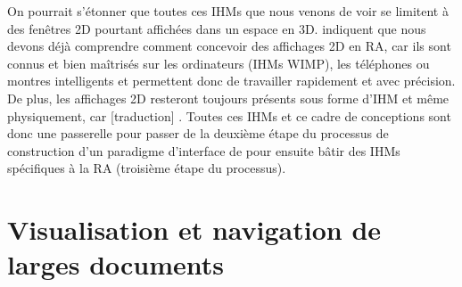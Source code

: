 
On pourrait s'étonner que toutes ces IHMs que nous venons de voir se limitent à des fenêtres 2D pourtant affichées dans un espace en 3D. \cite{Ens2014a} indiquent que nous devons déjà comprendre comment concevoir des affichages 2D en RA, car ils sont connus et bien maîtrisés sur les ordinateurs (IHMs WIMP), les téléphones ou montres intelligents et permettent donc de travailler rapidement et avec précision. De plus, les affichages 2D resteront toujours présents sous forme d'IHM et même physiquement, car [traduction]  \citep[p. 1]{Ens2014a}. Toutes ces IHMs et ce cadre de conceptions sont donc une passerelle pour passer de la deuxième étape du processus de construction d'un paradigme d'interface de \cite{Billinghurst2005} pour ensuite bâtir des IHMs spécifiques à la RA (troisième étape du processus).


\section{Visualisation et navigation de larges documents}
\label{sec:litterature_large_documents}

